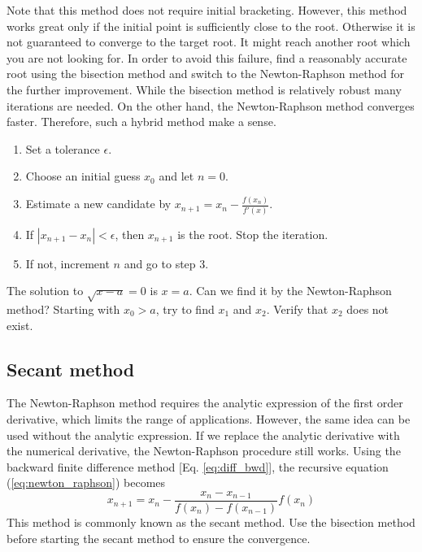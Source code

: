 Note that this method does not require initial bracketing.  However, 
this method works great only if the initial point is sufficiently close to the root. Otherwise it is not guaranteed to converge to the target root.  It might reach another root which you are not looking for. 
In order to avoid this failure, find a reasonably accurate root using the bisection method and switch to the Newton-Raphson method for the further improvement.  While the bisection method is relatively robust many iterations are needed.  On the other hand, the Newton-Raphson method converges faster.  Therefore, such a hybrid method make a sense. 

\bigskip
\begin{myalgobox}
		\label{argo:newton-raphson}
				
				\begin{minipage}{5.5in}
					\begin{enumerate}
						\item Set a tolerance $\epsilon$.
						\item Choose an initial guess $x_{0}$ and let $n=0$.
						\item Estimate a new candidate by $x_{n+1} = x_n - \displaystyle\frac{f(x_n)}{f'(x)}$.
						\item If $|x_{n+1}-x_n| < \epsilon$, then $x_{n+1}$ is the root.  Stop the iteration.
						\item If not, increment $n$ and go to step 3.
					\end{enumerate}
				\end{minipage}
\end{myalgobox}

\noindent
\exercise
The solution to $\sqrt{x-a} = 0$ is $x=a$.  Can we find it by the Newton-Raphson method?  Starting with $x_0 > a$, try to find $x_1$ and $x_2$. Verify that $x_2$ does not exist.



\subsection{Secant method}

The Newton-Raphson method requires the analytic expression of the first order derivative, which limits the range of applications. However, the same idea can be used without the analytic expression.  If we replace the analytic derivative with the numerical derivative, the Newton-Raphson procedure still works.  Using the backward finite difference method [Eq. \eqref{eq:diff_bwd}], the recursive equation (\ref{eq:newton_raphson}) becomes
\begin{equation}
x_{n+1} = x_n - \frac{x_{n}-x_{n-1}}{f(x_n)-f(x_{n-1})} f(x_n)
\end{equation}
This method is commonly known as the secant method. Use the bisection method before starting the secant method to ensure the convergence.

